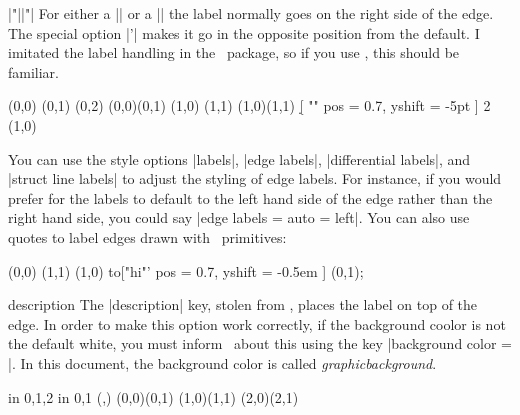 \begin{sseqdata}[name = basic, cohomological Serre grading]
\begin{manualentry}{|"||"|}
For either a |\structline| or a |\class| the label normally goes on the right
side of the edge. The special option |'| makes it go in the opposite position
from the default. I imitated the label handling in the \tikzcdpkg\ package, so
if you use \tikzcdpkg, this should be familiar.
\begin{codeexample}[width = 6cm]
\begin{sseqpage}[ Adams grading, yscale = 0.63 ]
\class(0,0)
\class(0,1)
\class(0,2)
\structline["a"' blue](0,0)(0,1)
\class(1,0)
\class(1,1)
\structline["b"](1,0)(1,1)
\d[ "" { pos = 0.7, yshift = -5pt } ] 2 (1,0)
\end{sseqpage}
\end{codeexample}
You can use the style options |labels|, |edge labels|, |differential labels|,
and |struct line labels| to adjust the styling of edge labels. For instance, if
you would prefer for the labels to default to the left hand side of the edge
rather than the right hand side, you could say |edge labels = {auto = left}|.
You can also use quotes to label edges drawn with \tikzpkg\ primitives:
\begin{codeexample}[width = 6cm]
\begin{sseqpage}[ yscale = 0.58, no axes ]
\class(0,0)
\class(1,1)
\draw (1,0) to["hi"'{ pos = 0.7, yshift = -0.5em }] (0,1);
\end{sseqpage}
\end{codeexample}

\begin{key}{description}
The |description| key, stolen from \tikzcdpkg, places the label on top of the
edge. In order to make this option work correctly, if the background coolor is
not the default white, you must inform \sseqpages\ about this using the key
|background color = |. In this document, the background color is
called \textit{graphicbackground}.
\begin{codeexample}[width = 6cm]
\begin{sseqpage}[ no axes, background color = graphicbackground ]
\foreach \x in {0,1,2} \foreach \y in {0,1} {
    \class(\x,\y)
}
\structline["a" red](0,0)(0,1)
\structline["a'"'blue,"b"{yshift = 1em}](1,0)(1,1)
\structline["c" description](2,0)(2,1)
\end{sseqpage}
\end{codeexample}
\end{key}
\end{manualentry}




\end{sseqdata}

